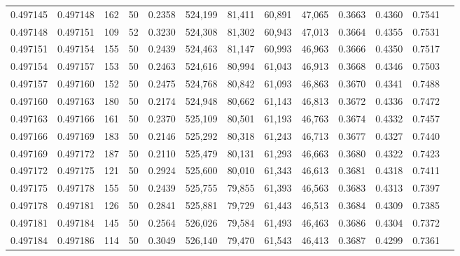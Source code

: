 \begin{tabular}{rrrrrrrrrrrrr}
0.497145 & 0.497148 &   162 &  50 &                                     0.2358 & 524,199 &  81,411 &  60,891 &  47,065 & 0.3663 & 0.4360 & 0.7541 \\
0.497148 & 0.497151 &   109 &  52 &                                     0.3230 & 524,308 &  81,302 &  60,943 &  47,013 & 0.3664 & 0.4355 & 0.7531 \\
0.497151 & 0.497154 &   155 &  50 &                                     0.2439 & 524,463 &  81,147 &  60,993 &  46,963 & 0.3666 & 0.4350 & 0.7517 \\
0.497154 & 0.497157 &   153 &  50 &                                     0.2463 & 524,616 &  80,994 &  61,043 &  46,913 & 0.3668 & 0.4346 & 0.7503 \\
0.497157 & 0.497160 &   152 &  50 &                                     0.2475 & 524,768 &  80,842 &  61,093 &  46,863 & 0.3670 & 0.4341 & 0.7488 \\
0.497160 & 0.497163 &   180 &  50 &                                     0.2174 & 524,948 &  80,662 &  61,143 &  46,813 & 0.3672 & 0.4336 & 0.7472 \\
0.497163 & 0.497166 &   161 &  50 &                                     0.2370 & 525,109 &  80,501 &  61,193 &  46,763 & 0.3674 & 0.4332 & 0.7457 \\
0.497166 & 0.497169 &   183 &  50 &                                     0.2146 & 525,292 &  80,318 &  61,243 &  46,713 & 0.3677 & 0.4327 & 0.7440 \\
0.497169 & 0.497172 &   187 &  50 &                                     0.2110 & 525,479 &  80,131 &  61,293 &  46,663 & 0.3680 & 0.4322 & 0.7423 \\
0.497172 & 0.497175 &   121 &  50 &                                     0.2924 & 525,600 &  80,010 &  61,343 &  46,613 & 0.3681 & 0.4318 & 0.7411 \\
0.497175 & 0.497178 &   155 &  50 &                                     0.2439 & 525,755 &  79,855 &  61,393 &  46,563 & 0.3683 & 0.4313 & 0.7397 \\
0.497178 & 0.497181 &   126 &  50 &                                     0.2841 & 525,881 &  79,729 &  61,443 &  46,513 & 0.3684 & 0.4309 & 0.7385 \\
0.497181 & 0.497184 &   145 &  50 &                                     0.2564 & 526,026 &  79,584 &  61,493 &  46,463 & 0.3686 & 0.4304 & 0.7372 \\
0.497184 & 0.497186 &   114 &  50 &                                     0.3049 & 526,140 &  79,470 &  61,543 &  46,413 & 0.3687 & 0.4299 & 0.7361 \\

\end{tabular}
